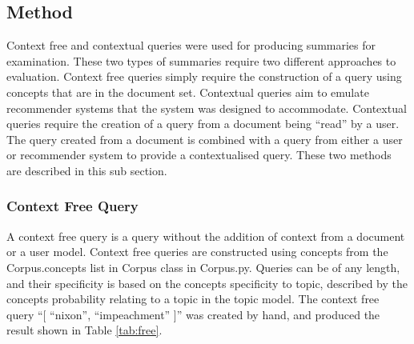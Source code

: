 \subsection{Method}
Context free and contextual queries were used for producing summaries for examination. These two types of summaries require two different approaches to evaluation. Context free queries simply require the construction of a query using concepts that are in the document set. Contextual queries aim to emulate recommender systems that the system was designed to accommodate.  Contextual queries require the creation of a query from a document being “read” by a user. The query created from a document is combined with a query from either a user or recommender system to provide a contextualised query. These two methods are described in this sub section.

\subsubsection{Context Free Query}
A context free query is a query without the addition of context from a document or a user model. Context free queries are constructed using concepts from the Corpus.concepts list in Corpus class in Corpus.py. Queries can be of any length, and their specificity is based on the concepts specificity to topic, described by the concepts probability relating to a topic in the topic model. The context free query “[ “nixon”, “impeachment” ]” was created by hand, and produced the result shown in Table \ref{tab:free}.

